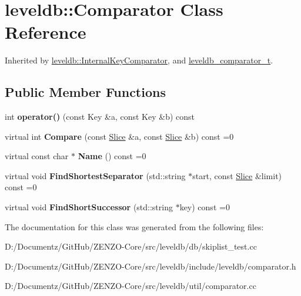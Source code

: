 \hypertarget{structleveldb_1_1_comparator}{}\section{leveldb\+::Comparator Class Reference}
\label{structleveldb_1_1_comparator}


Inherited by \mbox{\hyperlink{classleveldb_1_1_internal_key_comparator}{leveldb\+::\+Internal\+Key\+Comparator}}, and \mbox{\hyperlink{structleveldb__comparator__t}{leveldb\+\_\+comparator\+\_\+t}}.

\subsection*{Public Member Functions}
\begin{DoxyCompactItemize}
\item 
\mbox{\label{structleveldb_1_1_comparator_af56f4d3b86bd598dde1d1af379ea486d}} 
int {\bfseries operator()} (const Key \&a, const Key \&b) const
\item 
\mbox{\label{structleveldb_1_1_comparator_a05dae6edcad3c7db23827c0233d74039}} 
virtual int {\bfseries Compare} (const \mbox{\hyperlink{classleveldb_1_1_slice}{Slice}} \&a, const \mbox{\hyperlink{classleveldb_1_1_slice}{Slice}} \&b) const =0
\item 
\mbox{\label{structleveldb_1_1_comparator_a888b039bdd6d59517dca75fb40721f5e}} 
virtual const char $\ast$ {\bfseries Name} () const =0
\item 
\mbox{\label{structleveldb_1_1_comparator_abdfe6076225e95b91ffd94f646063115}} 
virtual void {\bfseries Find\+Shortest\+Separator} (std\+::string $\ast$start, const \mbox{\hyperlink{classleveldb_1_1_slice}{Slice}} \&limit) const =0
\item 
\mbox{\label{structleveldb_1_1_comparator_a49751dd906595633161dfad943d24b3b}} 
virtual void {\bfseries Find\+Short\+Successor} (std\+::string $\ast$key) const =0
\end{DoxyCompactItemize}


The documentation for this class was generated from the following files\+:\begin{DoxyCompactItemize}
\item 
D\+:/\+Documentz/\+Git\+Hub/\+Z\+E\+N\+Z\+O-\/\+Core/src/leveldb/db/skiplist\+\_\+test.\+cc\item 
D\+:/\+Documentz/\+Git\+Hub/\+Z\+E\+N\+Z\+O-\/\+Core/src/leveldb/include/leveldb/comparator.\+h\item 
D\+:/\+Documentz/\+Git\+Hub/\+Z\+E\+N\+Z\+O-\/\+Core/src/leveldb/util/comparator.\+cc\end{DoxyCompactItemize}
